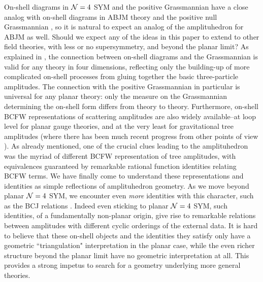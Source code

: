 \documentclass[12pt,nohyper,twosided]{JHEP3}
\begin{document}
On-shell diagrams in ${\cal N} = 4$ SYM and the positive
Grassmannian have a close analog with on-shell diagrams in ABJM
theory and the positive null Grassmannian \cite{Huang:2013owa}, so
it is natural to expect an analog of the amplituhedron for ABJM as
well. Should we expect any of the ideas in this paper to extend to
other field theories, with less or no supersymmetry, and beyond the
planar limit? As explained in \cite{N6}, the connection between
on-shell diagrams and the Grassmannian is valid for any theory in
four dimensions, reflecting only the building-up of more complicated
on-shell processes from gluing together the basic three-particle
amplitudes. The connection with the positive Grassmannian in
particular is universal for any planar theory: only the measure on
the Grassmannian determining the on-shell form differs from theory
to theory. Furthermore, on-shell BCFW representations of scattering
amplitudes are also widely available--at loop level for planar gauge
theories, and at the very least for gravitational tree amplitudes
(where there has been much recent progress from other points of view
\cite{Hodges:2012ym,Cachazo:2012da,Cachazo:2012kg,Skinner:2013xp,Cachazo:2013hca,Cachazo:2013iea}).
As already mentioned, one of the crucial clues leading to the
amplituhedron was the myriad of different BCFW representation of
tree amplitudes, with equivalences guaranteed by remarkable rational
function identities relating BCFW terms. We have finally come to
understand these representations and identities as simple
reflections of amplituhedron geometry. As we move beyond planar
${\cal N} = 4$ SYM, we encounter even {\it more} identities with
this character, such as the BCJ relations \cite{Bern:2008qj,
Bern:2010ue}. Indeed even sticking to planar ${\cal N} = 4$ SYM,
such identities, of a fundamentally non-planar origin, give rise to
remarkable relations between amplitudes with different cyclic
orderings of the external data. It is hard to believe that these
on-shell objects and the identities they satisfy only have a
geometric ``triangulation" interpretation in the planar case, while
the even richer structure beyond the planar limit have no geometric
interpretation at all. This provides a strong impetus to search for
a geometry underlying more general theories.
\end{document}
